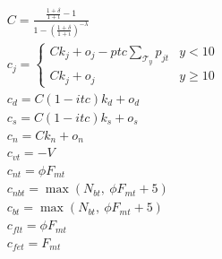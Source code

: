 \documentclass[9pt, oneside]{article}
\numberwithin{equation}{subsubsection}
\begin{document}
\begin{subequations}
	\begin{align}
		 & C = \frac{\frac{1+\delta}{1+\iota} - 1}{1 - \left(\frac{1+\delta}{1+\iota} \right)^{-\lambda}}                                                                              \\[1em]
		 & c_j = \left\{ \begin{array}{ll}
			                 C k_j + o_j - ptc \sum_{\mathcal{T}_y} p_{jt} & y < 10    \\
			                 C k_j + o_j                                  & y \geq 10
		                 \end{array} \right.                                                                                           \\
		 & c_d = C (1-itc) k_d + o_d                                                                                                                                                   \\
		 & c_s = C (1-itc) k_s + o_s                                                                                                                                                   \\
		 & c_{n} = C k_n + o_n                                                                                                                                                         \\
		 & c_{vt} = -V                                                                                                                                                                 \\
		 & c_{nt} = \phi F_{mt}                                                                                                                                                        \\
		 & c_{nbt} = \max \left( N_{bt} ,\: \phi F_{mt} + 5 \right)                                                                                                                      \\
		 & c_{bt} = \max \left( N_{bt} ,\: \phi F_{mt} + 5 \right)                                                                                                                       \\
		 & c_{flt} = \phi F_{mt}                                                                                                                                                       \\
		 & c_{fet} = F_{mt}                                                                                                                                                            \\

\end{align}
\end{subequations}
\end{document}

